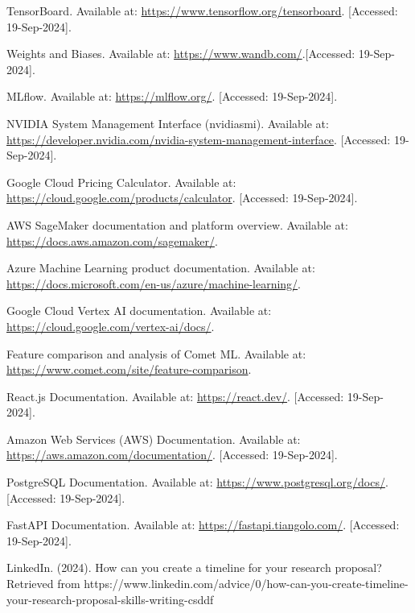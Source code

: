 \documentclass[12pt]{article}
\begin{document}
 
\begin{thebibliography}{9}

TensorBoard. Available at: \url{https://www.tensorflow.org/tensorboard}. [Accessed: 19-Sep-2024].

Weights and Biases. Available at: \url{https://www.wandb.com/}.[Accessed: 19-Sep-2024].

MLflow. Available at: \url{https://mlflow.org/}. [Accessed: 19-Sep-2024].

NVIDIA System Management Interface (nvidiasmi). Available at: \url{https://developer.nvidia.com/nvidia-system-management-interface}. [Accessed: 19-Sep-2024].


Google Cloud Pricing Calculator. Available at: \url{https://cloud.google.com/products/calculator}. [Accessed: 19-Sep-2024].

AWS SageMaker documentation and platform overview. Available at: \url{https://docs.aws.amazon.com/sagemaker/}.
    
Azure Machine Learning product documentation. Available at: \url{https://docs.microsoft.com/en-us/azure/machine-learning/}.
    
Google Cloud Vertex AI documentation. Available at: \url{https://cloud.google.com/vertex-ai/docs/}.
       
Feature comparison and analysis of Comet ML.
Available at: \url{https://www.comet.com/site/feature-comparison}.

React.js Documentation. Available at: \url{https://react.dev/}. [Accessed: 19-Sep-2024].

Amazon Web Services (AWS) Documentation. Available at: \url{https://aws.amazon.com/documentation/}. [Accessed: 19-Sep-2024].

PostgreSQL Documentation. Available at: \url{https://www.postgresql.org/docs/}. [Accessed: 19-Sep-2024].

FastAPI Documentation. Available at: \url{https://fastapi.tiangolo.com/}. [Accessed: 19-Sep-2024].

 LinkedIn. (2024). How can you create a timeline for your research proposal? Retrieved from https://www.linkedin.com/advice/0/how-can-you-create-timeline-your-research-proposal-skills-writing-csddf

\end{thebibliography}
\end{document}
